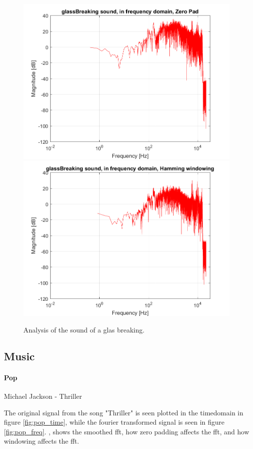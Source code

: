 \begin{figure}[htb!]
	{\includegraphics[width=0.45\linewidth]{code/glassBreaking_figure4.png}}
	{\includegraphics[width=0.45\linewidth]{code/glassBreaking_figure5.png}}
	\caption{Analysis of the sound of a glas breaking.}\label{fig:glassBreaking}
\end{figure}


\subsection{Music}

\paragraph{Pop}
Michael Jackson - Thriller

The original signal from the song "Thriller" is seen plotted in the timedomain in figure \ref{fig:pop_time}, while the fourier transformed signal is seen in figure \ref{fig:pop_freq}.
, shows the smoothed fft, how zero padding affects the fft, and how windowing affects the fft.


